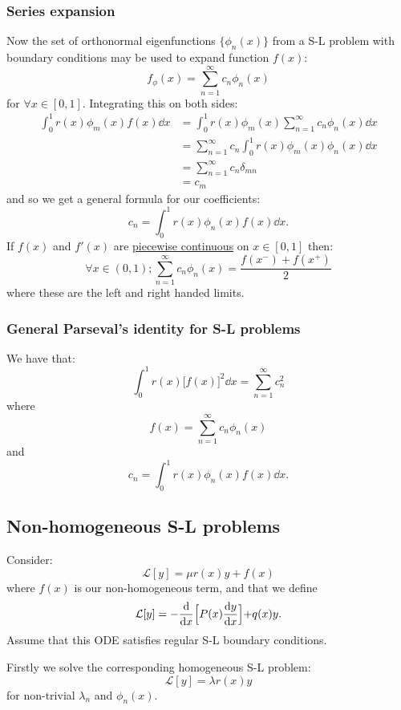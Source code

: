 \documentclass{article}
\begin{document}
\newpage

\subsubsection{Series expansion}
Now the set of orthonormal eigenfunctions $\{\phi_n(x)\}$
from a S-L problem with boundary conditions
may be used to expand function $f(x)$:
$$f_\phi(x)=\sum_{n=1}^{\infty} c_n\phi_n(x)$$
for $\forall x\in[0,1]$. Integrating this on both sides:
\begin{align*}
    \int_{0}^{1}r(x)\phi_m(x)f(x)\dd x
    &=\int_{0}^{1}r(x)\phi_m(x)
    \sum_{n=1}^{\infty} c_n\phi_n(x)\dd x \\
    &=\sum_{n=1}^{\infty} c_n
    \int_{0}^{1}r(x)\phi_m(x)\phi_n(x)\dd x \\
    &=\sum_{n=1}^{\infty} c_n\delta_{mn} \\
    &=c_m
\end{align*}
and so we get a general formula for our coefficients:
$$c_n=\int_{0}^{1}r(x)\phi_n(x)f(x)\dd x.$$
If $f(x)$ and $f'(x)$ are \underline{piecewise continuous}
on $x\in[0,1]$ then:
$$\forall x\in(0,1);\sum_{n=1}^{\infty} c_n\phi_n(x)
=\frac{f(x^-)+f(x^+)}{2}$$
where these are the left and right handed limits.

\subsubsection{General Parseval's identity for S-L problems}
We have that:
$$\int_{0}^{1}r(x)\bigl[f(x)\bigr]^2\dd x
=\sum_{n=1}^{\infty}c_n^2$$
where
$$f(x)=\sum_{n=1}^{\infty} c_n\phi_n(x)$$
and
$$c_n=\int_{0}^{1}r(x)\phi_n(x)f(x)\dd x.$$

\newpage

\subsection{Non-homogeneous S-L problems}
Consider:
$$\mathcal{L}[y]=\mu r(x)y+f(x)$$
where $f(x)$ is our non-homogeneous term, and that we define
$$\mathcal{L}[y]=-\dv{x}\Bigl[P(x)\dv{y}{x}\Bigl]+q(x)y.$$
Assume that this ODE satisfies regular S-L boundary conditions.

Firstly we solve the corresponding homogeneous S-L problem:
$$\mathcal{L}[y]=\lambda r(x)y$$
for non-trivial $\lambda_n$ and $\phi_n(x)$.
\end{document}
